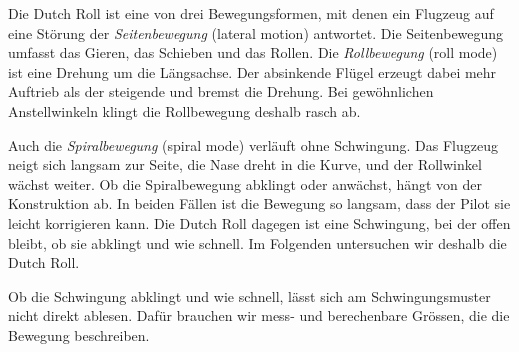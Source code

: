 Die Dutch Roll ist eine von drei Bewegungsformen, mit denen ein
Flugzeug auf eine Störung der \emph{Seitenbewegung} (lateral motion) antwortet.
%
Die Seitenbewegung umfasst das Gieren, das Schieben und das Rollen.
Die \emph{Rollbewegung} (roll mode) ist eine Drehung um die Längsachse.
%
%
Der absinkende Flügel erzeugt dabei mehr Auftrieb als der steigende und bremst
die Drehung.
Bei gewöhnlichen Anstellwinkeln klingt die Rollbewegung deshalb rasch ab.

Auch die \emph{Spiralbewegung} (spiral mode) verläuft ohne Schwingung.
%
%
Das Flugzeug neigt sich langsam zur Seite, die Nase dreht in die Kurve, und der
Rollwinkel wächst weiter.
Ob die Spiralbewegung abklingt oder anwächst, hängt von der Konstruktion ab.
In beiden Fällen ist die Bewegung so langsam, dass der Pilot sie leicht
korrigieren kann.
Die Dutch Roll dagegen ist eine Schwingung, bei der offen bleibt, ob sie
abklingt und wie schnell.
Im Folgenden untersuchen wir deshalb die Dutch Roll.

Ob die Schwingung abklingt und wie schnell, lässt sich am Schwingungsmuster
nicht direkt ablesen.
Dafür brauchen wir mess- und berechenbare Grössen, die die Bewegung beschreiben.
